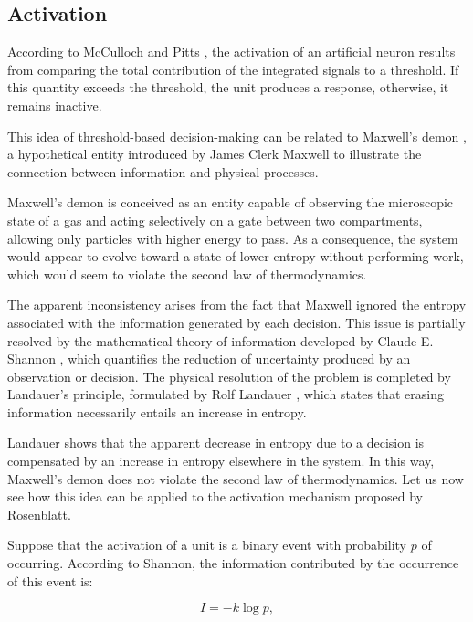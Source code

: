 \documentclass[12pt]{article}
\begin{document}
\subsection*{Activation}

According to McCulloch and Pitts \cite{mcculloch1943logical}, the activation of an artificial neuron results from comparing the total contribution of the integrated signals to a threshold. If this quantity exceeds the threshold, the unit produces a response, otherwise, it remains inactive.

This idea of threshold-based decision-making can be related to Maxwell’s demon \cite{maxwell1871theory}, a hypothetical entity introduced by James Clerk Maxwell to illustrate the connection between information and physical processes.

Maxwell’s demon is conceived as an entity capable of observing the microscopic state of a gas and acting selectively on a gate between two compartments, allowing only particles with higher energy to pass. As a consequence, the system would appear to evolve toward a state of lower entropy without performing work, which would seem to violate the second law of thermodynamics.

The apparent inconsistency arises from the fact that Maxwell ignored the entropy associated with the information generated by each decision. This issue is partially resolved by the mathematical theory of information developed by Claude E. Shannon \cite{shannon1948mathematical}, which quantifies the reduction of uncertainty produced by an observation or decision. The physical resolution of the problem is completed by Landauer’s principle, formulated by Rolf Landauer \cite{landauer1961irreversibility}, which states that erasing information necessarily entails an increase in entropy.

Landauer shows that the apparent decrease in entropy due to a decision is compensated by an increase in entropy elsewhere in the system. In this way, Maxwell’s demon does not violate the second law of thermodynamics. Let us now see how this idea can be applied to the activation mechanism proposed by Rosenblatt.

Suppose that the activation of a unit is a binary event with probability $p$ of occurring. According to Shannon, the information contributed by the occurrence of this event is:

\begin{equation}
I = -k \log p,
\end{equation}
\end{document}
